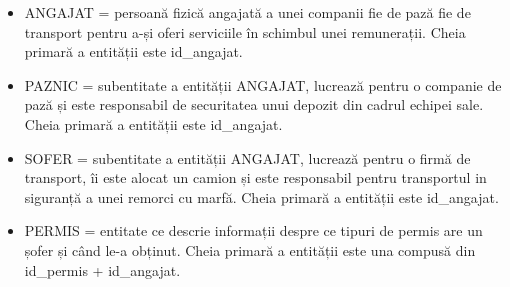 \documentclass[12pt, a4paper]{article}
\begin{document}
\begin{itemize}
    \item ANGAJAT = persoană fizică angajată a unei companii fie de pază fie de transport pentru a-și oferi serviciile în schimbul unei remunerații. Cheia primară a entității este id\_angajat.
    \item PAZNIC = subentitate a entității ANGAJAT, lucrează pentru o companie de pază și este responsabil de securitatea unui depozit din cadrul echipei sale. Cheia primară a entității este id\_angajat.
    \item SOFER = subentitate a entității ANGAJAT, lucrează pentru o firmă de transport, îi este alocat un camion și este responsabil pentru transportul in siguranță a unei remorci cu marfă. Cheia primară a entității este id\_angajat.
    \item PERMIS = entitate ce descrie informații despre ce tipuri de permis are un șofer și când le-a obținut. Cheia primară a entității este una compusă din id\_permis + id\_angajat.
\end{itemize}
\end{document}
